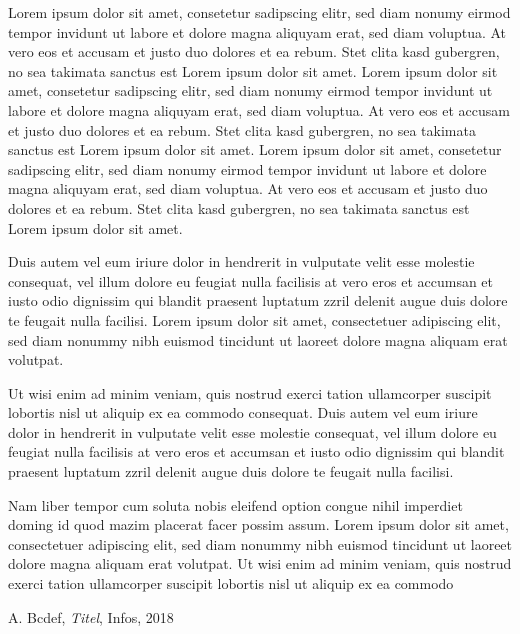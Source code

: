 \documentclass{article}
\begin{document}
Lorem ipsum dolor sit amet, consetetur sadipscing elitr, sed diam nonumy eirmod tempor invidunt ut labore et dolore magna aliquyam erat, sed diam voluptua. At vero eos et accusam et justo duo dolores et ea rebum. Stet clita kasd gubergren, no sea takimata sanctus est Lorem ipsum dolor sit amet. Lorem ipsum dolor sit amet, consetetur sadipscing elitr, sed diam nonumy eirmod tempor invidunt ut labore et dolore magna aliquyam erat, sed diam voluptua. At vero eos et accusam et justo duo dolores et ea rebum. Stet clita kasd gubergren, no sea takimata sanctus est Lorem ipsum dolor sit amet. Lorem ipsum dolor sit amet, consetetur sadipscing elitr, sed diam nonumy eirmod tempor invidunt ut labore et dolore magna aliquyam erat, sed diam voluptua. At vero eos et accusam et justo duo dolores et ea rebum. Stet clita kasd gubergren, no sea takimata sanctus est Lorem ipsum dolor sit amet.   

Duis autem vel eum iriure dolor in hendrerit in vulputate velit esse molestie consequat, vel illum dolore eu feugiat nulla facilisis at vero eros et accumsan et iusto odio dignissim qui blandit praesent luptatum zzril delenit augue duis dolore te feugait nulla facilisi. Lorem ipsum dolor sit amet, consectetuer adipiscing elit, sed diam nonummy nibh euismod tincidunt ut laoreet dolore magna aliquam erat volutpat.   

Ut wisi enim ad minim veniam, quis nostrud exerci tation ullamcorper suscipit lobortis nisl ut aliquip ex ea commodo consequat. Duis autem vel eum iriure dolor in hendrerit in vulputate velit esse molestie consequat, vel illum dolore eu feugiat nulla facilisis at vero eros et accumsan et iusto odio dignissim qui blandit praesent luptatum zzril delenit augue duis dolore te feugait nulla facilisi.   

Nam liber tempor cum soluta nobis eleifend option congue nihil imperdiet doming id quod mazim placerat facer possim assum. Lorem ipsum dolor sit amet, consectetuer adipiscing elit, sed diam nonummy nibh euismod tincidunt ut laoreet dolore magna aliquam erat volutpat. Ut wisi enim ad minim veniam, quis nostrud exerci tation ullamcorper suscipit lobortis nisl ut aliquip ex ea commodo







\newpage



\begin{thebibliography}{999}

 A. Bcdef, \emph{Titel}, Infos, 2018 \\[-2.8mm]



\end{thebibliography}
\end{document}
